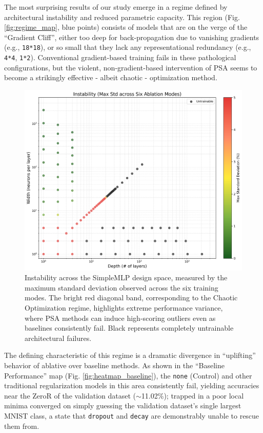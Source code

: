 \documentclass[conference]{IEEEtran}
\begin{document}
The most surprising results of our study emerge in a regime defined by architectural instability and reduced parametric capacity. This region (Fig. \ref{fig:regime_map}, blue points) consists of models that are on the verge of the ``Gradient Cliff'', either too deep for back-propagation due to vanishing gradients (e.g., \verb|18*18|), or so small that they lack any representational redundancy (e.g., \verb|4*4|, \verb|1*2|). Conventional gradient-based training fails in these pathological configurations, but the violent, non-gradient-based intervention of PSA seems to become a strikingly effective - albeit chaotic - optimization method.

\begin{figure}[ht]
\centering
\includegraphics[width=\linewidth]{SimpleMLP_Heatmap_Instability.png}
\caption{Instability across the SimpleMLP design space, measured by the maximum standard deviation observed across the six training modes. The bright red diagonal band, corresponding to the Chaotic Optimization regime, highlights extreme performance variance, where PSA methods can induce high-scoring outliers even as baselines consistently fail. Black represents completely untrainable architectural failures.}
\label{fig:heatmap_instability}
\end{figure}

The defining characteristic of this regime is a dramatic divergence in ``uplifting'' behavior of ablative over baseline methods. As shown in the ``Baseline Performance'' map (Fig. \ref{fig:heatmap_baseline}), the \verb|none| (Control) and other traditional regularization models in this area consistently fail, yielding accuracies near the ZeroR of the validation dataset ($\sim$11.02\%); trapped in a poor local minima converged on simply guessing the validation dataset's single largest MNIST class, a state that \verb|dropout| and \verb|decay| are demonstrably unable to rescue them from.
\end{document}
